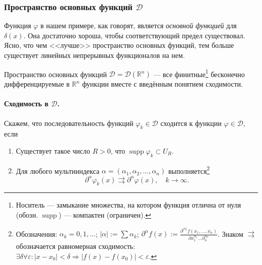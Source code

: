 \subsubsection{Пространство основных функций $ \mathcal D $} Функция $ \varphi $ в
нашем примере, как говорят, является \emph{основной функцией} для $ \delta(x) $.
Она достаточно хороша, чтобы соответствующий предел существовал. Ясно, что чем
<<лучше>> пространство основных функций, тем больше существует линейных непрерывных
функционалов на нем. 

Пространство основных функций $ \mathcal D = \mathcal D(\mathbb R^n) $ ---
все финитные\footnote{Носитель --- замыкание множества, на котором функция
	отлична от нуля (обозн. $ \operatorname{supp} $) --- компактен (ограничен).} бесконечно дифференцируемые в $
\mathbb R^n $ функции вместе с введённым понятием сходимости.

\paragraph{Сходимость в $ \mathcal D $.} Скажем, что последовательность функций $ \varphi_k \in
\mathcal D$ сходится к функции $ \varphi \in \mathcal D $, если 
\begin{enumerate}
	\item Существует такое число $ R > 0 $, что $ \operatorname{supp} \varphi_k \subset U_R $.
	\item Для любого мультииндекса $ \alpha = (\alpha_1, \alpha_2, \ldots,
	\alpha_n) $ выполняется\footnote{Обозначения: $\alpha_k = 0, 1, \ldots$;
		$|\alpha| := \sum \alpha_k$; $\partial^\alpha f(x) :=
		\frac{\partial^{|\alpha|}f(x_1, \ldots, x_n)}{\partial x_1^{\alpha_1}
			\ldots\partial_n^{\alpha_n}}$. Знаком $ \rightrightarrows $ обозначается
		равномерная сходимость: $ \exists \delta \forall\varepsilon\colon |x-x_0| < \delta
		\Rightarrow |f(x) - f(x_0)| < \varepsilon $.} 
	\[
	\partial^\alpha \varphi_k(x) \rightrightarrows \partial^\alpha\varphi(x),
	\quad k \to \infty.
	\]
\end{enumerate}

